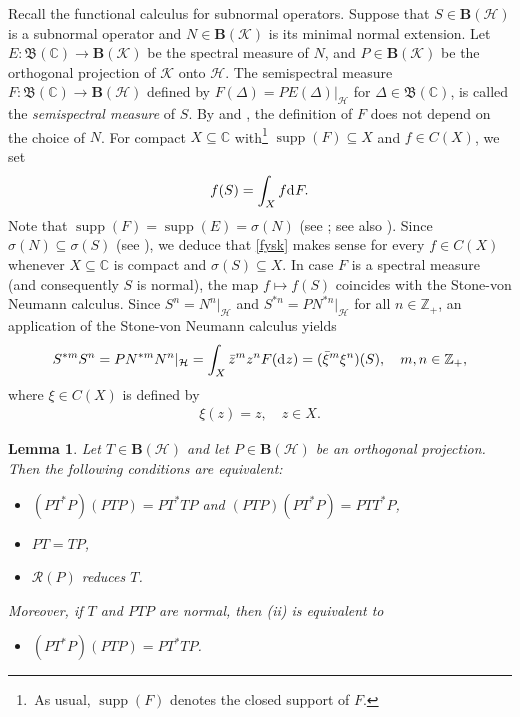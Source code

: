 \documentclass[reqno]{amsproc}
\DeclareMathOperator{\supp}{supp}
\numberwithin{equation}{section}
\newtheorem{lemma}[theorem]{Lemma}
\theoremstyle{remark}
\newcommand*{\hh}{\mathcal{H}}
\newcommand*{\kk}{\mathcal{K}}
\newcommand*{\comp}{\mathbb{C}}
\newcommand*{\borel}{\mathfrak{B}}
\newcommand*{\cbb}{\comp}
\newcommand*{\D}{\mathrm{d\hspace{.1ex}}}
\theoremstyle{definition}
\newcommand*{\ran}{\mathscr{R}}
\newcommand*{\ogr}{\boldsymbol{B}}
\newcommand*{\zbb}{\mathbb{Z}}
\begin{document}
Recall the functional calculus for subnormal
operators. Suppose that $S\in \ogr(\hh)$ is a
subnormal operator and $N\in \ogr(\kk)$ is its minimal
normal extension. Let $E\colon \borel(\cbb) \to
\ogr(\kk)$ be the spectral measure of $N$, and $P\in
\ogr(\kk)$ be the orthogonal projection of $\kk$ onto
$\hh$. The semispectral measure $F\colon \borel(\cbb)
\to \ogr(\hh)$ defined by $F(\varDelta) =
PE(\varDelta)|_{\hh}$ for $\varDelta \in\borel(\cbb)$,
is called the {\em semispectral measure} of $S$. By
\cite[Proposition~5]{Ju-St08} and
\cite[Proposition~II.2.5]{Con91}, the definition of
$F$ does not depend on the choice of $N$. For compact
$X \subseteq \cbb$ with\footnote{\,As usual,
$\supp(F)$ denotes the closed support of $F$.}
$\supp(F) \subseteq X$ and $f \in C(X)$, we set
   \begin{align} \label{fysk}
f(S)=\int_{X} f \D F.
   \end{align}
Note that $\supp(F)=\supp(E)=\sigma(N)$ (see
\cite[Proposition~4(iii)]{Ju-St08}; see also
\cite[Theorem~4.4]{Ja02}). Since $\sigma(N)\subseteq
\sigma(S)$ (see \cite[Theorem~II.2.11]{Con91}), we
deduce that \eqref{fysk} makes sense for every $f \in
C(X)$ whenever $X\subseteq \cbb$ is compact and
$\sigma(S) \subseteq X$. In case $F$ is a spectral
measure (and consequently $S$ is normal), the map $f
\mapsto f(S)$ coincides with the Stone-von Neumann
calculus. Since $S^n=N^n|_{\hh}$ and
$S^{*n}=PN^{*n}|_{\hh}$ for all $n\in \zbb_+$, an
application of the Stone-von Neumann calculus yields
   \begin{equation} \label{add-2}
S^{*m}S^n = PN^{*m}N^n|_{\hh} = \int_{X}
\bar z^m z^{n} F(\D z) = (\bar\xi^m
\xi^n)(S), \quad m,n \in \zbb_+,
   \end{equation}
where $\xi\in C(X)$ is defined by
   \begin{align} \label{ksik}
\xi(z) = z, \quad z \in X.
   \end{align}
   \begin{lemma} \label{rudec}
Let $T\in \ogr(\hh)$ and let $P \in
\ogr(\hh)$ be an orthogonal projection. Then
the following conditions are
equivalent{\em:}
   \begin{itemize}
   \item[(i)]
$(PT^*P)(PTP) = PT^*TP$ and $(PTP)(PT^*P) =
PTT^*P$,
   \item[(ii)] $PT=TP$,
   \item[(iii)] $\ran(P)$ reduces $T$.
   \end{itemize}
Moreover, if $T$ and $PTP$ are normal, then
{\em (ii)} is equivalent to
   \begin{itemize}
\item[(iv)] $(PT^*P)(PTP) = PT^*TP$.
   \end{itemize}
   \end{lemma}
\end{document}
